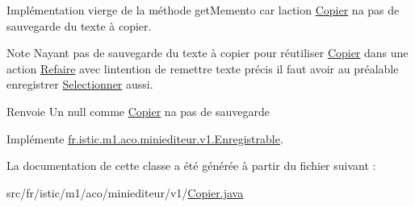 Implémentation vierge de la méthode get\+Memento car l\textquotesingle{}action \hyperlink{classfr_1_1istic_1_1m1_1_1aco_1_1miniediteur_1_1v1_1_1Copier}{Copier} n\textquotesingle{}a pas de sauvegarde du texte à copier. 

\begin{DoxyNote}{Note}
N\textquotesingle{}ayant pas de sauvegarde du texte à copier pour réutiliser \hyperlink{classfr_1_1istic_1_1m1_1_1aco_1_1miniediteur_1_1v1_1_1Copier}{Copier} dans une action \hyperlink{classfr_1_1istic_1_1m1_1_1aco_1_1miniediteur_1_1v1_1_1Refaire}{Refaire} avec l\textquotesingle{}intention de remettre texte précis il faut avoir au préalable enregistrer \hyperlink{classfr_1_1istic_1_1m1_1_1aco_1_1miniediteur_1_1v1_1_1Selectionner}{Selectionner} aussi. 
\end{DoxyNote}
\begin{DoxyReturn}{Renvoie}
Un null comme \hyperlink{classfr_1_1istic_1_1m1_1_1aco_1_1miniediteur_1_1v1_1_1Copier}{Copier} n\textquotesingle{}a pas de sauvegarde 
\end{DoxyReturn}


Implémente \hyperlink{interfacefr_1_1istic_1_1m1_1_1aco_1_1miniediteur_1_1v1_1_1Enregistrable}{fr.\+istic.\+m1.\+aco.\+miniediteur.\+v1.\+Enregistrable}.



La documentation de cette classe a été générée à partir du fichier suivant \+:\begin{DoxyCompactItemize}
\item 
src/fr/istic/m1/aco/miniediteur/v1/\hyperlink{Copier_8java}{Copier.\+java}\end{DoxyCompactItemize}

